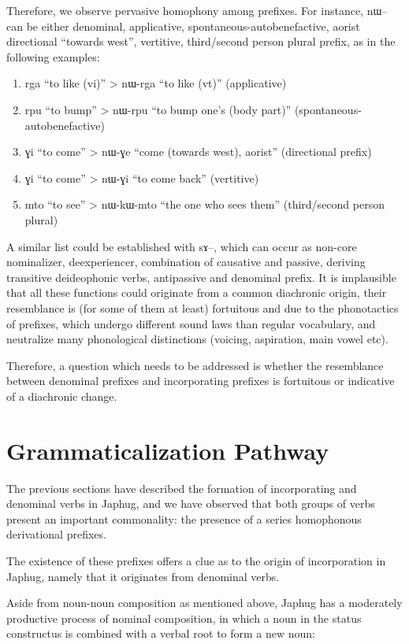 \documentclass[oldfontcommands,oneside,a4paper,11pt]{article}
\newcommand{\ipa}[1]{{\phon #1}} %
\begin{document}
Therefore, we observe pervasive homophony among prefixes. For instance, \ipa{nɯ}-- can be either denominal, applicative, spontaneous-autobenefactive, aorist directional ``towards west'', vertitive, third/second person plural prefix, as in the following examples:
 \begin{enumerate}
\item \ipa{rga} ``to like (vi)'' > \ipa{nɯ-rga} ``to like (vt)'' (applicative)
\item  \ipa{rpu} ``to bump'' > \ipa{nɯ-rpu}  ``to bump one's (body part)'' (spontaneous-autobenefactive)
\item \ipa{ɣi} ``to come'' > \ipa{nɯ-ɣe} ``come (towards west), aorist'' (directional prefix)
\item \ipa{ɣi} ``to come'' > \ipa{nɯ-ɣi} ``to come back'' (vertitive)
\item \ipa{mto} ``to see'' > \ipa{nɯ-kɯ-mto} ``the one who sees them'' (third/second person plural)
\end{enumerate}

 

A similar  list could be established with  \ipa{sɤ}--, which can occur as non-core nominalizer, deexperiencer, combination of causative and passive, deriving transitive deideophonic verbs, antipassive and denominal prefix. It is implausible that all these functions could originate from a common diachronic origin,  their resemblance is (for some of them at least) fortuitous and due to the phonotactics of prefixes, which undergo different sound laws than regular vocabulary, and neutralize many phonological distinctions (voicing, aspiration, main vowel etc).

Therefore, a question which needs to be addressed is whether the resemblance between denominal prefixes and incorporating prefixes is fortuitous or indicative of a diachronic change.

 \section{Grammaticalization Pathway}
The previous sections have described the formation of incorporating and denominal verbs in Japhug, and we have observed that both groups of verbs present an important commonality: the presence of a series homophonous derivational prefixes.

The existence of these prefixes offers a clue as to the origin of  incorporation in Japhug, namely that it originates from denominal verbs.

Aside from   noun-noun composition as mentioned above, Japhug has a moderately productive process of nominal composition, in which a noun in the \ipa{status constructus} is combined with a verbal root to form a new noun:
\end{document}
